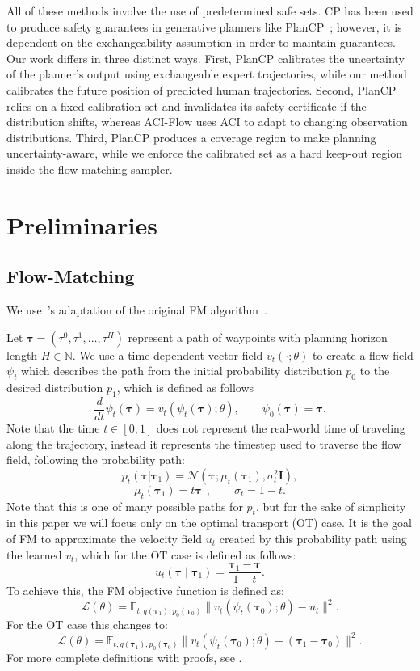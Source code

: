 All of these methods involve the use of predetermined safe sets. CP has been used to produce safety guarantees in generative planners like PlanCP~\cite{planCP}; however, it is dependent on the exchangeability assumption in order to maintain guarantees. Our work differs in three distinct ways. First, PlanCP calibrates the uncertainty of the planner's output using exchangeable expert trajectories, while our method calibrates the future position of predicted human trajectories. Second, PlanCP relies on a fixed calibration set and invalidates its safety certificate if the distribution shifts, whereas ACI-Flow uses ACI to adapt to changing observation distributions. Third, PlanCP produces a coverage region to make planning uncertainty-aware, while we enforce the calibrated set as a hard keep-out region inside the flow-matching sampler. 

\section{Preliminaries}
\subsection{Flow-Matching}

We use~\cite{yang_safeflowmatcher_2025}'s adaptation of the original FM algorithm~\cite{lipman_flowmatching_2022}.

Let \(\boldsymbol{\tau}=(\tau^0, \tau^1, \hdots, \tau^H)\) represent a path of waypoints with planning horizon length \(H \in \mathbb{N}\). We use a time-dependent vector field \(v_t(\cdot;\theta)\) to create a flow field \(\psi_t\) which describes the path from the initial probability distribution \(p_0\) to the desired distribution \(p_1\), which is defined as follows 
\[
\frac{d}{dt}\psi_t(\boldsymbol{\tau})=v_t(\psi_t(\boldsymbol{\tau});\theta),\qquad \psi_0(\boldsymbol{\tau})=\boldsymbol{\tau}.
\]
Note that the time \(t \in [0,1]\) does not represent the real-world time of traveling along the trajectory, instead it represents the timestep used to traverse the flow field, following the probability path:
\[
p_t(\boldsymbol{\tau}|\boldsymbol{\tau}_1)=\mathcal{N}(\boldsymbol{\tau}; \mu_t(\boldsymbol{\tau}_1),\sigma^2_t\mathbf{I}),
\]
\[
\mu_t(\boldsymbol{\tau}_1)=t\boldsymbol{\tau}_1, \qquad \sigma_t=1-t.
\]
Note that this is one of many possible paths for \(p_t\), but for the sake of simplicity in this paper we will focus only on the optimal transport (OT) case. It is the goal of FM to approximate the velocity field \(u_t\) created by this probability path using the learned \(v_t\), which for the OT case is defined as follows:
\[
u_t(\boldsymbol{\tau} \mid \boldsymbol{\tau}_1)=\frac{\boldsymbol{\tau}_1-\boldsymbol{\tau}}{1-t}.
\]
To achieve this, the FM objective function is defined as:
\[
\mathcal{L}(\theta)=\mathbb{E}_{t, q(\boldsymbol{\tau}_1), p_0(\boldsymbol{\tau}_0)}\big\| v_t(\psi_t(\boldsymbol{\tau}_0);\theta) - u_t \big\|^2
.\]
For the OT case this changes to:
\[
\mathcal{L}(\theta)=\mathbb{E}_{t, q(\boldsymbol{\tau}_1), p_0(\boldsymbol{\tau}_0)}\big\|v_t(\psi_t(\boldsymbol{\tau}_0);\theta)-(\boldsymbol{\tau}_1-\boldsymbol{\tau}_0)\big\|^2
.\]
For more complete definitions with proofs, see \cite{lipman_flowmatching_2022}.
